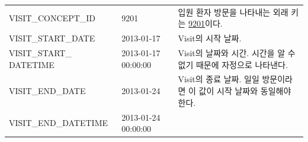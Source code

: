 \documentclass[11pt]{book}
\theoremstyle{definition}
\theoremstyle{definition}
\theoremstyle{definition}
\theoremstyle{remark}
\begin{document}
\begin{longtable}[]{@{}lll@{}}
\begin{minipage}[t]{0.28\columnwidth}
VISIT\_CONCEPT\_ID\strut
\end{minipage} & \begin{minipage}[t]{0.16\columnwidth}\raggedright\strut
9201\strut
\end{minipage} & \begin{minipage}[t]{0.48\columnwidth}\raggedright\strut
입원 환자 방문을 나타내는 외래 키는
\href{http://athena.ohdsi.org/search-terms/terms/9201}{9201}이다.\strut
\end{minipage}\tabularnewline
\begin{minipage}[t]{0.28\columnwidth}\raggedright\strut
VISIT\_START\_DATE\strut
\end{minipage} & \begin{minipage}[t]{0.16\columnwidth}\raggedright\strut
2013-01-17\strut
\end{minipage} & \begin{minipage}[t]{0.48\columnwidth}\raggedright\strut
Visit의 시작 날짜.\strut
\end{minipage}\tabularnewline
\begin{minipage}[t]{0.28\columnwidth}\raggedright\strut
VISIT\_START\_ DATETIME\strut
\end{minipage} & \begin{minipage}[t]{0.16\columnwidth}\raggedright\strut
2013-01-17 00:00:00\strut
\end{minipage} & \begin{minipage}[t]{0.48\columnwidth}\raggedright\strut
Visit의 날짜와 시간. 시간을 알 수 없기 때문에 자정으로 나타낸다.\strut
\end{minipage}\tabularnewline
\begin{minipage}[t]{0.28\columnwidth}\raggedright\strut
VISIT\_END\_DATE\strut
\end{minipage} & \begin{minipage}[t]{0.16\columnwidth}\raggedright\strut
2013-01-24\strut
\end{minipage} & \begin{minipage}[t]{0.48\columnwidth}\raggedright\strut
Visit의 종료 날짜. 일일 방문이라면 이 값이 시작 날짜와 동일해야
한다.\strut
\end{minipage}\tabularnewline
\begin{minipage}[t]{0.28\columnwidth}\raggedright\strut
VISIT\_END\_DATETIME\strut
\end{minipage} & \begin{minipage}[t]{0.16\columnwidth}\raggedright\strut
2013-01-24 00:00:00\strut
\end{minipage} & \begin{minipage}[t]{0.48\columnwidth}\raggedright\strut

\end{minipage}
\end{longtable}
\end{document}
